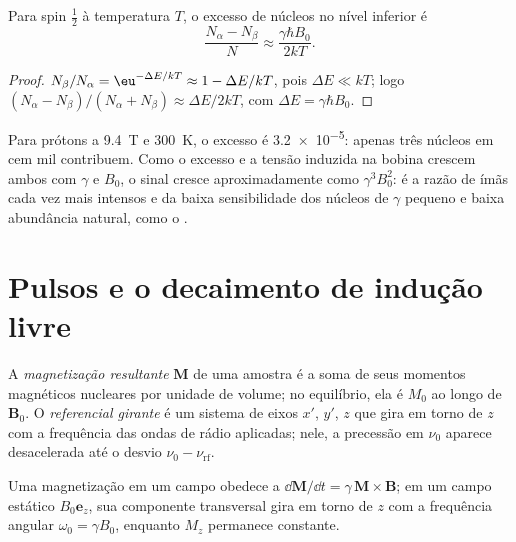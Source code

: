 \begin{proposition}\label{prop:b3:advanced-nmr:populations}
Para spin $\frac12$ à temperatura $T$, o excesso de núcleos no nível inferior é
\[
\frac{N_\alpha - N_\beta}{N} \approx \frac{\gamma\hbar B_0}{2kT}.
\]
\end{proposition}

\begin{proof}
$N_\beta/N_\alpha = \eu^{-\Delta E/kT} \approx 1 - \Delta E/kT$, pois $\Delta E \ll kT$; logo
$(N_\alpha - N_\beta)/(N_\alpha + N_\beta) \approx \Delta E/2kT$, com $\Delta E = \gamma\hbar B_0$.
\end{proof}

Para prótons a \qty{9.4}{T} e \qty{300}{K}, o excesso é \num{3.2e-5}: apenas
três núcleos em cem mil contribuem. Como o excesso e a tensão induzida na
bobina crescem ambos com $\gamma$ e $B_0$, o sinal cresce aproximadamente
como $\gamma^3B_0^2$: é a razão de ímãs cada vez mais intensos e da baixa
sensibilidade dos núcleos de $\gamma$ pequeno e baixa abundância natural, como o
.

\section{Pulsos e o decaimento de indução livre}

\begin{definition}\label{def:b3:advanced-nmr:magnetisation}
A \emph{magnetização resultante} $\mathbf M$ de uma amostra é a
soma de seus momentos magnéticos nucleares por unidade de volume; no equilíbrio, ela é
$M_0$ ao longo de $\mathbf B_0$. O \emph{referencial girante} é um sistema
de eixos $x'$, $y'$, $z$ que gira em torno de $z$ com a frequência das ondas de
rádio aplicadas; nele, a precessão em $\nu_0$ aparece desacelerada até o desvio $\nu_0 -
\nu_{\mathrm{rf}}$.
\end{definition}

\begin{proposition}[Precessão]\label{prop:b3:advanced-nmr:precession}
Uma magnetização em um campo obedece a $\dd\mathbf M/\dd t = \gamma\,\mathbf M\times\mathbf B$; em um
campo estático $B_0\mathbf e_z$, sua componente transversal gira em torno de $z$ com a frequência
angular $\omega_0 = \gamma B_0$, enquanto $M_z$ permanece constante.
\end{proposition}

